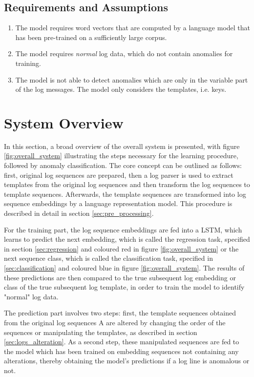 \subsection{Requirements and Assumptions \label{sec:requirements_and_assumptions}}
\begin{enumerate}
	\item The model requires word vectors that are computed by a language model that has been pre-trained on a sufficiently large corpus.
	\item The model requires \textit{normal} log data, which do not contain anomalies for training.
	\item The model is not able to detect anomalies which are only in the variable part of the log messages. The model only considers the templates, i.e. keys.
\end{enumerate}



\section{System Overview \label{sec:overall_system}}
In this section, a broad overview of the overall system is presented, with figure \ref{fig:overall_system} illustrating the steps necessary for the learning procedure, followed by anomaly classification. 
The core concept can be outlined as follows: first, original log sequences are prepared, then a log parser is used to extract templates from the original log sequences and then transform the log sequences to template sequences. Afterwards, the template sequences are transformed into log sequence embeddings by a language representation model. This procedure is described in detail in section \ref{sec:pre_processing}. 

For the training part, the log sequence embeddings are fed into a LSTM, which learns to predict the next embedding, which is called the regression task, specified in section \ref{sec:regression} and coloured red in figure \ref{fig:overall_system} or the next sequence class, which is called the classification task, specified in \ref{sec:classification} and coloured blue in figure \ref{fig:overall_system}. The results of these predictions are then compared to the true subsequent log embedding or class of the true subsequent log template, in order to train the model to identify "normal" log data.

The prediction part involves two steps: first, the template sequences obtained from the original log sequences A are altered by changing the order of the sequences or manipulating the templates, as described in section \ref{sec:logs_alteration}. As a second step, these manipulated sequences are fed to the model which has been trained on embedding sequences not containing any alterations, thereby obtaining the model's predictions if a log line is anomalous or not.

